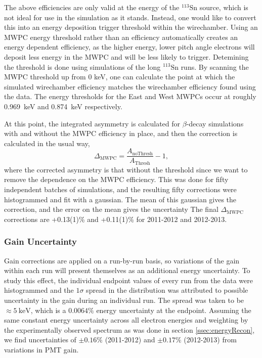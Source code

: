 The above efficiencies are only valid at the energy of the $^{113}\mathrm{Sn}$ source,
which is not ideal for use in the simulation as it stands.
Instead, one would
like to convert this into an energy deposition trigger threshold within the wirechamber.
Using an MWPC energy threshold rather than an efficiency
automatically creates an energy dependent efficiency, as the higher energy, lower pitch angle
electrons will deposit less energy in the MWPC and will be less likely to trigger.
Detemining the threshold is done using 
simulations of the long $^{113}\mathrm{Sn}$ runs. By scanning the MWPC threshold up from 0 keV, one can
calculate the point at which the simulated wirechamber efficiency matches the wirechamber
efficiency found using the data. The energy thresholds for the East and West
MWPCs occur at roughly 0.969~keV and 0.874~keV respectively.

At this point, the integrated asymmetry is calculated for $\beta$-decay simulations with and without
the MWPC efficiency in place, and then the correction is calculated in the usual way,
\begin{equation}
  \Delta_{\mathrm{MWPC}} = \frac{A_{\mathrm{noThresh}}}{A_{\mathrm{Thresh}}}-1, 
\end{equation}
%
\noindent where the corrected asymmetry is that without the threshold since we want to remove
the dependence on the MWPC efficiency. This was done for fifty independent batches of simulations,
and the resulting fifty corrections were histogrammed and fit with a gaussian. The mean of this gaussian
gives the correction, and the error on the mean gives the uncertainty
The final $\Delta_{\mathrm{MWPC}}$ corrections are +0.13(1)\% and +0.11(1)\% for 2011-2012 and 2012-2013. 


\subsubsection{Gain Uncertainty}

Gain corrections are applied on a run-by-run basis, so variations
of the gain within each run will present themselves as an additional
energy uncertainty. To study this effect, the individual endpoint values
of every run from the data were histogrammed and the $1\sigma$ spread in
the distribution was attributed to possible uncertainty in the gain during
an individual run. The spread was taken to be $\approx 5~\mathrm{keV}$, which
is a $0.0064\%$ energy uncertainty at the endpoint. Assuming the same constant energy
uncertainty across all electron energies and weighting by the experimentally observed
spectrum as was done in section \ref{ssec:energyRecon}, we find uncertainties 
of $\pm0.16\%$ (2011-2012) and $\pm0.17\%$ (2012-2013) from variations in PMT gain.


